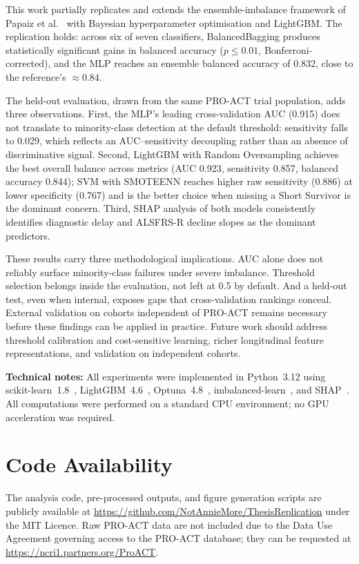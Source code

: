 \documentclass[preprint,12pt]{elsarticle}
\begin{document}
This work partially replicates and extends the ensemble-imbalance framework of Papaiz
et al.~\cite{Papaiz2024} with Bayesian hyperparameter optimisation
and LightGBM. The replication holds: across six of seven classifiers,
BalancedBagging produces statistically significant gains in balanced accuracy
($p \leq 0.01$, Bonferroni-corrected), and the MLP reaches an ensemble balanced
accuracy of 0.832, close to the reference's $\approx$0.84.

The held-out evaluation, drawn from the same PRO-ACT trial population, adds three
observations. First, the MLP's leading cross-validation AUC (0.915) does not
translate to minority-class detection at the default threshold: sensitivity falls
to 0.029, which reflects an AUC--sensitivity decoupling rather than an absence of
discriminative signal. Second, LightGBM with Random Oversampling achieves the best
overall balance across metrics (AUC 0.923, sensitivity 0.857, balanced accuracy
0.844); SVM with SMOTEENN reaches higher raw sensitivity (0.886) at lower
specificity (0.767) and is the better choice when missing a Short Survivor
is the dominant concern. Third, SHAP analysis of both models consistently identifies
diagnostic delay and ALSFRS-R decline slopes as the dominant predictors.

These results carry three methodological implications. AUC alone does not
reliably surface minority-class failures under severe imbalance. Threshold
selection belongs inside the evaluation, not left at 0.5 by default. And a
held-out test, even when internal, exposes gaps that cross-validation rankings
conceal. External validation on cohorts independent of
PRO-ACT remains necessary before these findings can be applied in practice.
Future work should address threshold calibration and cost-sensitive learning,
richer longitudinal feature representations, and validation on independent cohorts.

\textbf{Technical notes:}
All experiments were implemented in Python~3.12 using scikit-learn~1.8~\cite{pedregosa2011scikit}, LightGBM~4.6~\cite{ke2017lightgbm}, Optuna~4.8~\cite{akiba2019optuna}, imbalanced-learn~\cite{lemaitre2017}, and SHAP~\cite{lundberg2017shap}. All computations were performed on a standard CPU environment; no GPU acceleration was required.


\section*{Code Availability}
The analysis code, pre-processed outputs, and figure generation scripts are
publicly available at \url{https://github.com/NotAnnieMore/ThesisReplication}
under the MIT Licence.
Raw PRO-ACT data are not included due to the Data Use Agreement governing
access to the PRO-ACT database; they can be requested at
\url{https://ncri1.partners.org/ProACT}.
\end{document}
